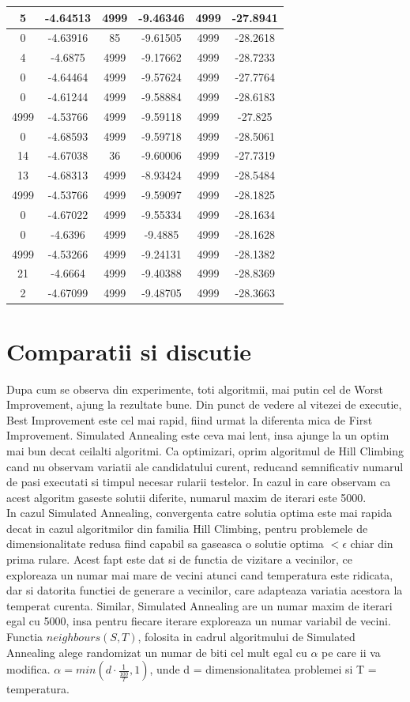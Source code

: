 \documentclass{article}
\begin{document}
\begin{tabular}{cccccc}
5&-4.64513&4999&-9.46346&4999&-27.8941 \\ \hline
0&-4.63916&85&-9.61505&4999&-28.2618 \\ \hline
4&-4.6875&4999&-9.17662&4999&-28.7233 \\ \hline
0&-4.64464&4999&-9.57624&4999&-27.7764 \\ \hline
0&-4.61244&4999&-9.58884&4999&-28.6183 \\ \hline
4999&-4.53766&4999&-9.59118&4999&-27.825 \\ \hline
0&-4.68593&4999&-9.59718&4999&-28.5061 \\ \hline
14&-4.67038&36&-9.60006&4999&-27.7319 \\ \hline
13&-4.68313&4999&-8.93424&4999&-28.5484 \\ \hline
4999&-4.53766&4999&-9.59097&4999&-28.1825 \\ \hline
0&-4.67022&4999&-9.55334&4999&-28.1634 \\ \hline
0&-4.6396&4999&-9.4885&4999&-28.1628 \\ \hline
4999&-4.53266&4999&-9.24131&4999&-28.1382 \\ \hline
21&-4.6664&4999&-9.40388&4999&-28.8369 \\ \hline
2&-4.67099&4999&-9.48705&4999&-28.3663 \\ \hline
\end{tabular}
\section{Comparatii si discutie}
Dupa cum se observa din experimente, toti algoritmii, mai putin cel de Worst Improvement, ajung la rezultate bune. Din punct de vedere al vitezei de executie, Best Improvement este cel mai rapid, fiind urmat la diferenta mica de First Improvement. Simulated Annealing este ceva mai lent, insa ajunge la un optim mai bun decat ceilalti algoritmi. Ca optimizari, oprim algoritmul de Hill Climbing cand nu observam variatii ale candidatului curent, reducand semnificativ numarul de pasi executati si timpul necesar rularii testelor. In cazul in care observam ca acest algoritm gaseste solutii diferite, numarul maxim de iterari este 5000. \\
In cazul Simulated Annealing, convergenta catre solutia optima este mai rapida decat in cazul algoritmilor din familia Hill Climbing, pentru problemele de dimensionalitate redusa fiind capabil sa gaseasca o solutie optima $ < \epsilon $ chiar din prima rulare. Acest fapt este dat si de functia de vizitare a vecinilor, ce exploreaza un numar mai mare de vecini atunci cand temperatura este ridicata, dar si datorita functiei de generare a vecinilor, care adapteaza variatia acestora la temperat curenta. Similar, Simulated Annealing are un numar maxim de iterari egal cu 5000, insa pentru fiecare iterare exploreaza un numar variabil de vecini.
Functia $neighbours(S, T )$, folosita in cadrul algoritmului de Simulated Annealing alege randomizat un numar de biti cel mult egal cu $\alpha$ pe care ii va modifica. $\alpha = min(d \cdot \frac{1}{\frac{100}{T}}, 1)$, unde d = dimensionalitatea problemei si T = temperatura.
\end{document}
